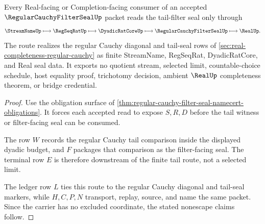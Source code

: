 \begin{theorem}
\label{thm:regular-cauchy-filter-seal-tail-route}
Every Real-facing or Completion-facing consumer of an accepted $\RegularCauchyFilterSealUp$ packet reads the tail-filter seal only through
$$
\StreamNameUp \longmapsto \RegSeqRatUp \longmapsto \DyadicRatCoreUp \longmapsto \RegularCauchyFilterSealUp \longmapsto \RealUp .
$$
The route realizes the regular Cauchy diagonal and tail-seal rows of \autoref{sec:real-completeness-regular-cauchy} as finite StreamName, RegSeqRat, DyadicRatCore, and Real seal data. It exports no quotient stream, selected limit, countable-choice schedule, host equality proof, trichotomy decision, ambient $\RealUp$ completeness theorem, or bridge credential.
\end{theorem}
\begin{proof}
Use the obligation surface of \autoref{thm:regular-cauchy-filter-seal-namecert-obligations}. It forces each accepted read to expose $S,R,D$ before the tail witness or filter-facing seal can be consumed.

The row $W$ records the regular Cauchy tail comparison inside the displayed dyadic budget, and $F$ packages that comparison as the filter-facing seal. The terminal row $E$ is therefore downstream of the finite tail route, not a selected limit.

The ledger row $L$ ties this route to the regular Cauchy diagonal and tail-seal markers, while $H,C,P,N$ transport, replay, source, and name the same packet. Since the carrier has no excluded coordinate, the stated nonescape claims follow.
\end{proof}





